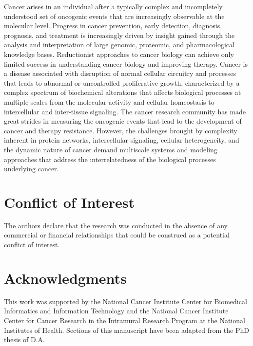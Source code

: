 \documentclass{article}
\begin{document}
Cancer arises in an individual after a typically complex and
incompletely understood set of oncogenic events that are increasingly
observable at the molecular level. Progress in cancer prevention,
early detection, diagnosis, prognosis, and treatment is increasingly
driven by insight gained through the analysis and interpretation of
large genomic, proteomic, and pharmacological knowledge
bases. Reductionist approaches to cancer biology can achieve only
limited success in understanding cancer biology and improving
therapy. Cancer is a disease associated with disruption of normal
cellular circuitry and processes that leads to abnormal or
uncontrolled proliferative growth, characterized by a complex spectrum
of biochemical alterations that affects biological processes at
multiple scales from the molecular activity and cellular homeostasis
to intercellular and inter-tissue signaling. The cancer research
community has made great strides in measuring the oncogenic events
that lead to the development of cancer and therapy
resistance. However, the challenges brought by complexity inherent in
protein networks, intercellular signaling, cellular heterogeneity, and
the dynamic nature of cancer demand multiscale systems and modeling
approaches that address the interrelatedness of the biological
processes underlying cancer.

\section{Conflict of Interest}

The authors declare that the research was conducted in the absence of
any commercial or financial relationships that could be construed as a
potential conflict of interest.

\section{Acknowledgments}
This work was supported by the National Cancer Institute Center for
Biomedical Informatics and Information Technology and the National
Cancer Institute Center for Cancer Research in the Intramural Research
Program at the National Institutes of Health. Sections of this
manuscript have been adapted from the PhD thesis
\cite{Addepalli2014-oa} of D.A.

\printbibliography
\end{document}
